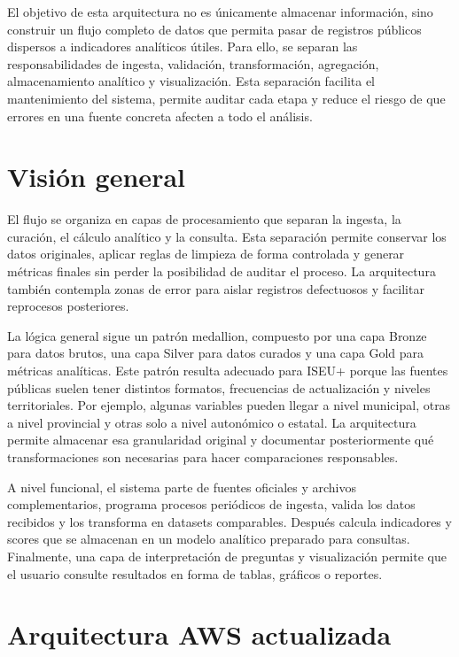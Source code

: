 El objetivo de esta arquitectura no es únicamente almacenar información, sino construir un flujo completo de datos que permita pasar de registros públicos dispersos a indicadores analíticos útiles. Para ello, se separan las responsabilidades de ingesta, validación, transformación, agregación, almacenamiento analítico y visualización. Esta separación facilita el mantenimiento del sistema, permite auditar cada etapa y reduce el riesgo de que errores en una fuente concreta afecten a todo el análisis.

\section{Visión general}

El flujo se organiza en capas de procesamiento que separan la ingesta, la curación, el cálculo analítico y la consulta. Esta separación permite conservar los datos originales, aplicar reglas de limpieza de forma controlada y generar métricas finales sin perder la posibilidad de auditar el proceso. La arquitectura también contempla zonas de error para aislar registros defectuosos y facilitar reprocesos posteriores.

La lógica general sigue un patrón medallion, compuesto por una capa Bronze para datos brutos, una capa Silver para datos curados y una capa Gold para métricas analíticas. Este patrón resulta adecuado para ISEU+ porque las fuentes públicas suelen tener distintos formatos, frecuencias de actualización y niveles territoriales. Por ejemplo, algunas variables pueden llegar a nivel municipal, otras a nivel provincial y otras solo a nivel autonómico o estatal. La arquitectura permite almacenar esa granularidad original y documentar posteriormente qué transformaciones son necesarias para hacer comparaciones responsables.

A nivel funcional, el sistema parte de fuentes oficiales y archivos complementarios, programa procesos periódicos de ingesta, valida los datos recibidos y los transforma en datasets comparables. Después calcula indicadores y scores que se almacenan en un modelo analítico preparado para consultas. Finalmente, una capa de interpretación de preguntas y visualización permite que el usuario consulte resultados en forma de tablas, gráficos o reportes.

\section{Arquitectura AWS actualizada}

